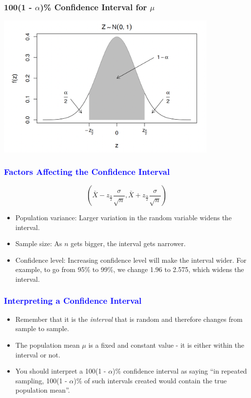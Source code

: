 \documentclass[12pt]{beamer}
\begin{document}
\begin{frame}
	\frametitle{100(1 - $\alpha$)\% Confidence Interval for $\mu$}
	\centering
	\includegraphics[width=11cm]{table.png}
\end{frame}
\begin{frame}
	\frametitle{\textcolor{blue}{Factors Affecting the Confidence Interval}}
	
	\begin{equation*}
		\left(\bar{X} - z_{\frac{\alpha}{2}}\frac{\sigma}{\sqrt{n}}, \bar{X} + z_{\frac{\alpha}{2}}\frac{\sigma}{\sqrt{n}}\right)
	\end{equation*}
	
	\begin{itemize}[label={\color{blue}$\blacktriangleright$}]
		\item Population variance: Larger variation in the random variable widens the interval.
		
		\item Sample size: As $n$ gets bigger, the interval gets narrower.
		
		\item Confidence level: Increasing confidence level will make the interval wider. For example, to go from 95\% to 99\%, we change 1.96 to 2.575, which widens the interval.
	\end{itemize}
	
\end{frame}
\begin{frame}
	\frametitle{\textcolor{blue}{Interpreting a Confidence Interval}}
	
	\begin{itemize}[label={\color{blue}$\blacktriangleright$}]
		\item Remember that it is the \textit{interval} that is random and therefore changes from sample to sample.
		
		\item The population mean $\mu$ is a fixed and constant value - it is either within the interval or not.
		
		\item You should interpret a 100(1 - $\alpha$)\% confidence interval as saying ``in repeated sampling, 100(1 - $\alpha$)\% of such intervals created would contain the true population mean''.
	\end{itemize}
	
\end{frame}
\end{document}
